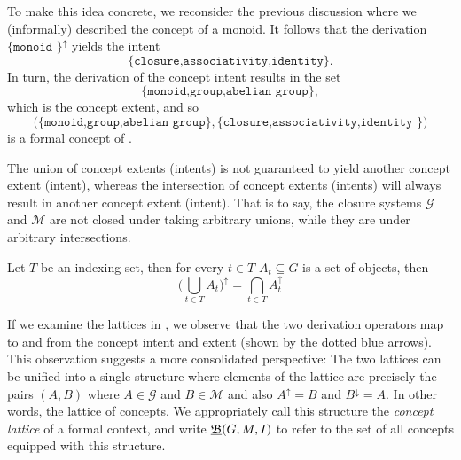 To make this idea concrete, we reconsider the previous discussion where we (informally) described the concept of a monoid.
It follows that the derivation $\{\texttt{monoid }\}^{\uparrow}$ yields the intent
\[
	\{\texttt{closure,associativity,identity}\}.
\]
%
In turn, the derivation of the concept intent results in the set
\[
	\{\texttt{monoid,group,abelian group}\},
\]which is the concept extent, and so
\[
	\big(\{\texttt{monoid,group,abelian group}\}, \{\texttt{closure,associativity,identity }\}\big)
\]
is a formal concept of .

The union of concept extents (intents) is not guaranteed to yield another concept extent (intent), whereas the
intersection of concept extents (intents) will always result in another concept extent (intent). That is to say, the
closure systems $\mathcal{G}$ and $\mathcal{M}$ are not closed under taking arbitrary unions, while they are under arbitrary
intersections.

\begin{proposition}
	\label{proposition:intersection-union-concepts} Let $T$ be an indexing set, then for every $t \in T$
	$A_{t}\subseteq G$ is a set of objects, then
	\[
		\big( \underset{t \in T}\bigcup A_{t}\big)^{\uparrow}= \underset{t \in T}\bigcap A_{t}^{\uparrow}
	\]
\end{proposition}

If we examine the lattices in , we observe that the two derivation operators map to and from the
concept intent and extent (shown by the dotted blue arrows). This observation suggests a more consolidated perspective: The
two lattices can be unified into a single structure where elements of the lattice are precisely the pairs $(A,B)$ where $A
\in \mathcal{G}$ and $B \in \mathcal{M}$ and also $A^{\uparrow}= B$ and $B^{\downarrow}= A$. In other words, the lattice
of concepts. We appropriately call this structure the \textit{concept lattice} of a formal context, and write $\underline{{\mathfrak B}} (G,M,\mathrel{I})$
to refer to the set of all concepts equipped with this structure.

